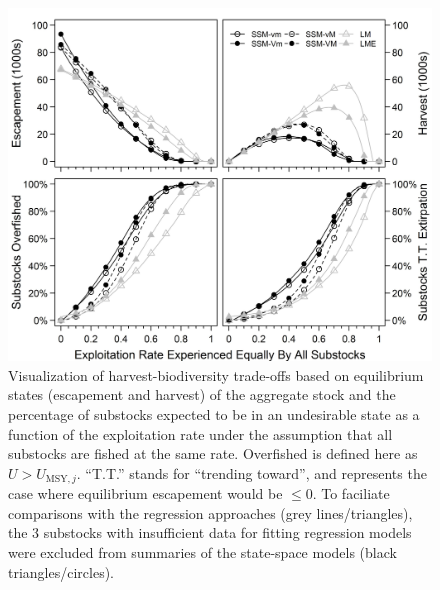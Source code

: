 \documentclass[12pt,]{book}
\theoremstyle{definition}
\theoremstyle{definition}
\theoremstyle{definition}
\theoremstyle{remark}
\begin{document}
\begin{figure}
  \centering
  \includegraphics{img/Ch4/kusko-eq-states.jpg}
  \caption{Visualization of harvest-biodiversity trade-offs based on equilibrium states (escapement and harvest) of the aggregate stock and the percentage of substocks expected to be in an undesirable state as a function of the exploitation rate under the assumption that all substocks are fished at the same rate. Overfished is defined here as $U > U_{\text{MSY},j}$. ``T.T.'' stands for ``trending toward'', and represents the case where equilibrium escapement would be $\le 0$. To faciliate comparisons with the regression approaches (grey lines/triangles), the 3 substocks with insufficient data for fitting regression models were excluded from summaries of the state-space models (black triangles/circles).} 
  \label{fig:kusko-eq-states}
\end{figure}

\clearpage
\pagestyle{empty}
\end{document}
